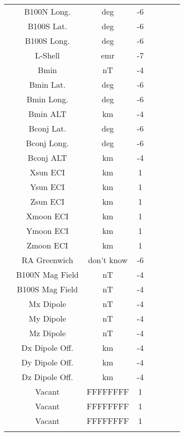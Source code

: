 \begin{table}
\begin{center}
\begin{tabular}{lccccccc}
 &B100N Long.		&deg			&-6\\
 &B100S Lat.		&deg			&-6\\
 &B100S Long.		&deg			&-6\\
 &L-Shell 			&emr			&-7\\
 &Bmin 			&nT			&-4\\
 &Bmin Lat.			&deg			&-6\\
 &Bmin Long.		&deg			&-6\\
 &Bmin ALT			&km			&-4\\
 &Bconj Lat.		&deg			&-6\\
 &Bconj Long.		&deg			&-6\\
 &Bconj ALT			&km			&-4\\
 &Xsun ECI 			&km			&1\\
 &Ysun ECI 			&km			&1\\
 &Zsun ECI 			&km			&1\\
 &Xmoon ECI			&km			&1\\
 &Ymoon ECI			&km			&1\\
 &Zmoon ECI			&km			&1\\
 &RA Greenwich		&don't know		&-6\\
 &B100N Mag Field 	&nT			&-4\\
 &B100S Mag Field 	&nT			&-4\\
 &Mx Dipole 		&nT			&-4\\
 &My Dipole 		&nT			&-4\\
 &Mz Dipole 		&nT			&-4\\
 &Dx Dipole Off. 		&km			&-4\\
 &Dy Dipole Off. 		&km			&-4\\
 &Dz Dipole Off. 		&km			&-4\\
 &Vacant                &FFFFFFFF		&1\\           	
 &Vacant                &FFFFFFFF		&1\\     
 &Vacant                &FFFFFFFF		&1\\
 &\\
    
 \hline
\end{tabular}  
\end{center}
\normalsize
\end{table}
\newpage
{}\\




